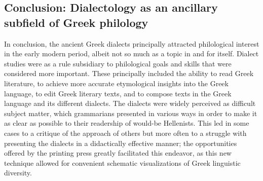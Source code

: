 \subsection{Conclusion: Dialectology as an ancillary subfield of Greek philology}
\hypertarget{Toc19704825}{}
In conclusion, the ancient Greek dialects principally attracted philological interest in the early modern period, albeit not so much as a topic in and for itself. Dialect studies were as a rule subsidiary to philological goals and skills that were considered more important. These principally included the ability to read Greek literature, to achieve more accurate etymological insights into the Greek language, to edit Greek literary texts, and to compose texts in the Greek language and its different dialects. The dialects were widely perceived as difficult subject matter, which grammarians presented in various ways in order to make it as clear as possible to their readership of would-be Hellenists. This led in some cases to a critique of the approach of others but more often to a struggle with presenting the dialects in a didactically effective manner; the opportunities offered by the printing press greatly facilitated this endeavor, as this new technique allowed for convenient schematic visualizations of Greek linguistic diversity.


